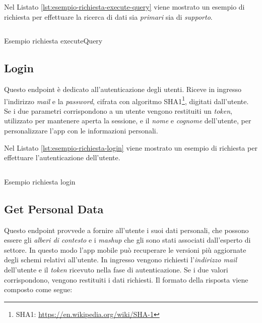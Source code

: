 Nel Listato \ref{lst:esempio-richiesta-execute-query} viene mostrato un esempio di richiesta per effettuare la ricerca di dati sia \emph{primari} sia di \emph{supporto}.

\begin{listing}[H]
	\inputminted{text}{5-implementazione-backend/Codice/esempio_richiesta_execute_query.graphql}
	\caption{Esempio richiesta executeQuery}
	\label{lst:esempio-richiesta-execute-query}
\end{listing}

\subsection{Login\label{sec:login-endpoint}}

Questo endpoint è dedicato all'autenticazione degli utenti. Riceve in ingresso l'indirizzo \emph{mail} e la \emph{password}, cifrata con algoritmo SHA1\footnote{SHA1: \url{https://en.wikipedia.org/wiki/SHA-1}}, digitati dall'utente. Se i due parametri corrispondono a un utente vengono restituiti un \emph{token}, utilizzato per mantenere aperta la sessione, e il \emph{nome} e \emph{cognome} dell'utente, per personalizzare l'app con le informazioni personali.

Nel Listato \ref{lst:esempio-richiesta-login} viene mostrato un esempio di richiesta per effettuare l'autenticazione dell'utente.

\begin{listing}[H]
	\inputminted{text}{5-implementazione-backend/Codice/esempio_richiesta_login.graphql}
	\caption{Esempio richiesta login}
	\label{lst:esempio-richiesta-login}
\end{listing}

\subsection{Get Personal Data\label{sec:get-personal-data-endpoint}}

Questo endpoint provvede a fornire all'utente i suoi dati personali, che possono essere gli \emph{alberi di contesto} e i \emph{mashup} che gli sono stati associati dall'esperto di settore. In questo modo l'app mobile può recuperare le versioni più aggiornate degli schemi relativi all'utente. In ingresso vengono richiesti l'\emph{indirizzo mail} dell'utente e il \emph{token} ricevuto nella fase di autenticazione. Se i due valori corrispondono, vengono restituiti i dati richiesti. Il formato della risposta viene composto come segue:

